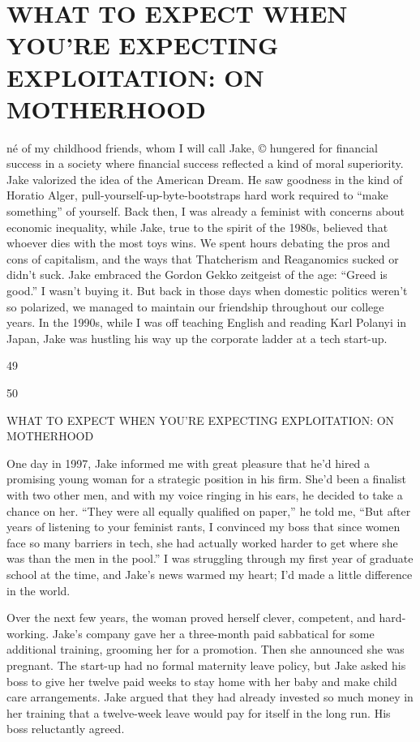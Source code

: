 \chapter{WHAT TO EXPECT WHEN YOU'RE EXPECTING EXPLOITATION: ON MOTHERHOOD}\label{WHAT TO EXPECT WHEN YOU'RE EXPECTING EXPLOITATION: ON MOTHERHOOD}
 \par 
 né of my childhood friends, whom I will call Jake, © hungered for financial success in a society where financial success reflected a kind of moral superiority. Jake valorized the idea of the American Dream. He saw goodness in the kind of Horatio Alger, pull-yourself-up-byte-bootstraps hard work required to “make something” of yourself. Back then, I was already a feminist with concerns about economic inequality, while Jake, true to the spirit of the 1980s, believed that whoever dies with the most toys wins. We spent hours debating the pros and cons of capitalism, and the ways that Thatcherism and Reaganomics sucked or didn’t suck. Jake embraced the Gordon Gekko zeitgeist of the age: “Greed is good.” I wasn't buying it. But back in those days when domestic politics weren't so polarized, we managed to maintain our friendship throughout our college years. In the 1990s, while I was off teaching English and reading Karl Polanyi in Japan, Jake was hustling his way up the corporate ladder at a tech start-up.
 \par 
49
 \par 
50
 \par 
WHAT TO EXPECT WHEN YOU'RE EXPECTING EXPLOITATION: ON MOTHERHOOD
 \par 
One day in 1997, Jake informed me with great pleasure that he’d hired a promising young woman for a strategic position in his firm. She’d been a finalist with two other men, and with my voice ringing in his ears, he decided to take a chance on her. “They were all equally qualified on paper,” he told me, “But after years of listening to your feminist rants, I convinced my boss that since women face so many barriers in tech, she had actually worked harder to get where she was than the men in the pool.” I was struggling through my first year of graduate school at the time, and Jake’s news warmed my heart; I’d made a little difference in the world.
 \par 
Over the next few years, the woman proved herself clever, competent, and hard-working. Jake’s company gave her a three-month paid sabbatical for some additional training, grooming her for a promotion. Then she announced she was pregnant. The start-up had no formal maternity leave policy, but Jake asked his boss to give her twelve paid weeks to stay home with her baby and make child care arrangements. Jake argued that they had already invested so much money in her training that a twelve-week leave would pay for itself in the long run. His boss reluctantly agreed.
